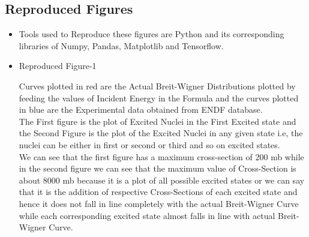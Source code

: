 \documentclass{article}
\begin{document}
\subsection{Reproduced Figures}
\begin{itemize}
\item Tools used to Reproduce these figures are Python and its corresponding libraries of Numpy, Pandas, Matplotlib and Tensorflow.
\item Reproduced Figure-1\\
\begin{figure}[htp] 
    \centering
    \hfill%
\end{figure}
Curves plotted in red are the Actual Breit-Wigner Distributions plotted by feeding the values of Incident Energy in the Formula and the curves plotted in blue are the Experimental data obtained from ENDF database.\\ 
The First figure is the plot of Excited Nuclei in the First Excited state and the Second Figure is the plot of the Excited Nuclei in any given state i.e, the nuclei can be either in first or second or third and so on excited states.\\
We can see that the first figure has a maximum cross-section of 200 mb while in the second figure we can see that the maximum value of Cross-Section is about 8000 mb because it is a plot of all possible excited states or we can say that it is the addition of respective Cross-Sections of each excited state and hence it does not fall in line completely with the actual Breit-Wigner Curve while each corresponding excited state almost falls in line with actual Breit-Wigner Curve.


\end{itemize}
\end{document}
